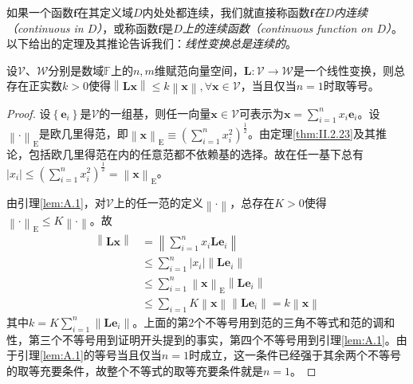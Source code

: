 \documentclass[main.tex]{subfiles}
\begin{document}
如果一个函数$\mathbf{f}$在其定义域$D$内处处都连续，我们就直接称函数$\mathbf{f}$\emph{在$D$内连续（continuous in $D$）}，或称函数$\mathbf{f}$是\emph{$D$上的连续函数（continuous function on $D$）}。以下给出的定理及其推论告诉我们：\emph{线性变换总是连续的}。

\begin{theorem}\label{thm:II.4.3}
    设$\mathcal{V}$、$\mathcal{W}$分别是数域$\mathbb{F}$上的$n,m$维赋范向量空间，$\mathbf{L}:\mathcal{V}\rightarrow\mathcal{W}$是一个线性变换，则总存在正实数$k>0$使得$\left\|\mathbf{Lx}\right\|\leq k\left\|\mathbf{x}\right\|,\forall\mathbf{x}\in\mathcal{V}$，当且仅当$n=1$时取等号。
\end{theorem}
\begin{proof}
    设$\left\{\mathbf{e}_i\right\}$是$\mathcal{V}$的一组基，则任一向量$\mathbf{x}\in\mathcal{V}$可表示为$\mathbf{x}=\sum_{i=1}^nx_i\mathbf{e}_i$。设$\left\|\cdot\right\|_\mathrm{E}$是欧几里得范，即$\left\|\mathbf{x}\right\|_\mathrm{E}\equiv\left(\sum_{i=1}^nx_i^2\right)^\frac{1}{2}$。由定理\ref{thm:II.2.23}及其推论，包括欧几里得范在内的任意范都不依赖基的选择。故在任一基下总有$\left|x_i\right|\leq\left(\sum_{i=1}^nx_i^2\right)^\frac{1}{2}=\left\|\mathbf{x}\right\|_\mathrm{E}$。

    由引理\ref{lem:A.1}，对$\mathcal{V}$上的任一范的定义$\left\|\cdot\right\|$，总存在$K>0$使得$\left\|\cdot\right\|_\mathrm{E}\leq K\left\|\cdot\right\|$。故
    \begin{align*}
        \left\|\mathbf{Lx}\right\| & =\left\|\sum_{i=1}^nx_i\mathbf{Le}_i\right\|                                                     \\
                                   & \leq\sum_{i=1}^n\left|x_i\right|\left\|\mathbf{Le}_i\right\|                                     \\
                                   & \leq\sum_{i=1}^n\left\|\mathbf{x}\right\|_\mathrm{E}\left\|\mathbf{Le}_i\right\|                 \\
                                   & \leq\sum_{i=1} K\left\|\mathbf{x}\right\|\left\|\mathbf{Le}_i\right\|=k\left\|\mathbf{x}\right\|
    \end{align*}
    其中$k=K\sum_{i=1}^n\left\|\mathbf{Le}_i\right\|$。上面的第2个不等号用到范的三角不等式和范的调和性，第三个不等号用到证明开头提到的事实，第四个不等号用到引理\ref{lem:A.1}。由于引理\ref{lem:A.1}的等号当且仅当$n=1$时成立，这一条件已经强于其余两个不等号的取等充要条件，故整个不等式的取等充要条件就是$n=1$。
\end{proof}
\end{document}
